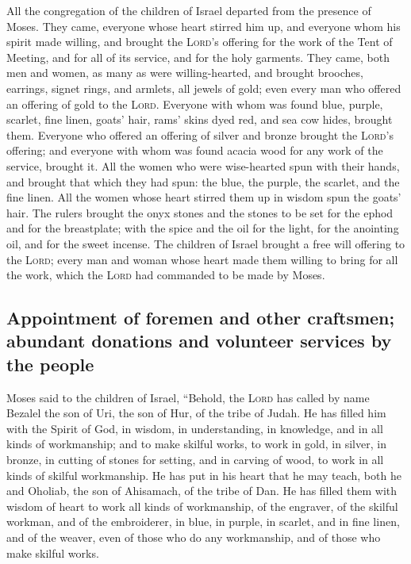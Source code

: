  All the congregation of the children of Israel departed
from the presence of Moses.  They came, everyone whose
heart stirred him up, and everyone whom his spirit made willing, and
brought the \textsc{Lord}'s offering for the work of the Tent of
Meeting, and for all of its service, and for the holy garments.
 They came, both men and women, as many as were
willing-hearted, and brought brooches, earrings, signet rings, and
armlets, all jewels of gold; even every man who offered an offering of
gold to the \textsc{Lord}.  Everyone with whom was found
blue, purple, scarlet, fine linen, goats' hair, rams' skins dyed red,
and sea cow hides, brought them.  Everyone who offered an
offering of silver and bronze brought the \textsc{Lord}'s offering; and
everyone with whom was found acacia wood for any work of the service,
brought it.  All the women who were wise-hearted spun
with their hands, and brought that which they had spun: the blue, the
purple, the scarlet, and the fine linen.  All the women
whose heart stirred them up in wisdom spun the goats' hair.
 The rulers brought the onyx stones and the stones to be
set for the ephod and for the breastplate;  with the
spice and the oil for the light, for the anointing oil, and for the
sweet incense.  The children of Israel brought a free
will offering to the \textsc{Lord}; every man and woman whose heart made
them willing to bring for all the work, which the \textsc{Lord} had
commanded to be made by Moses.

\hypertarget{appointment-of-foremen-and-other-craftsmen-abundant-donations-and-volunteer-services-by-the-people}{%
\subsection{Appointment of foremen and other craftsmen; abundant
donations and volunteer services by the
people}\label{appointment-of-foremen-and-other-craftsmen-abundant-donations-and-volunteer-services-by-the-people}}

 Moses said to the children of Israel, ``Behold, the
\textsc{Lord} has called by name Bezalel the son of Uri, the son of Hur,
of the tribe of Judah.  He has filled him with the Spirit
of God, in wisdom, in understanding, in knowledge, and in all kinds of
workmanship;  and to make skilful works, to work in gold,
in silver, in bronze,  in cutting of stones for setting,
and in carving of wood, to work in all kinds of skilful workmanship.
 He has put in his heart that he may teach, both he and
Oholiab, the son of Ahisamach, of the tribe of Dan.  He
has filled them with wisdom of heart to work all kinds of workmanship,
of the engraver, of the skilful workman, and of the embroiderer, in
blue, in purple, in scarlet, and in fine linen, and of the weaver, even
of those who do any workmanship, and of those who make skilful works.

